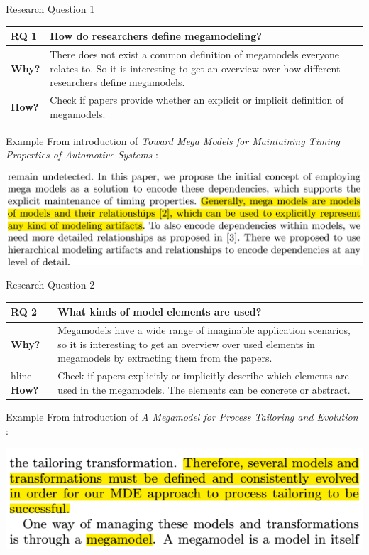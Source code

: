 \documentclass{beamer}
\begin{document}
\begin{frame}{Research Question 1}
\begin{tabular}{|l|p{9cm}|}\hline
\textbf{RQ 1} & How do researchers define megamodeling?\\\hline
\textbf{Why?} & There does not exist a common definition of me\-ga\-mo\-dels everyone relates to. So it is interesting to get an overview over how different researchers define megamodels.\\\hline
\textbf{How?} & Check if papers provide whether an explicit or implicit definition of megamodels.\\\hline
\end{tabular}
\end{frame}

\begin{frame}{Example}
From introduction of \textit{Toward Mega Models for Maintaining Timing Properties of Automotive Systems} \cite{Neumann_models2010}:
\begin{center}
\includegraphics[width=1.0\textwidth]{ex_rq1}
\end{center}
\end{frame}

\begin{frame}{Research Question 2}
\begin{tabular}{|l|p{9cm}|}\hline
\textbf{RQ 2} & What kinds of model elements are used?\\\hline
\textbf{Why?} & Megamodels have a wide range of imaginable application scenarios, so it is interesting to get an overview over used elements in megamodels by extracting them from the papers.\\hline
\textbf{How?} & Check if papers explicitly or implicitly describe which elements are used in the megamodels. The elements can be concrete or abstract.\\\hline
\end{tabular}
\end{frame}

\begin{frame}{Example}
From introduction of \textit{A Megamodel for Process Tailoring and Evolution} \cite{tailoring}:
\begin{center}
\includegraphics[width=1.0\textwidth]{ex_rq2}
\end{center}
\end{frame}
\end{document}
